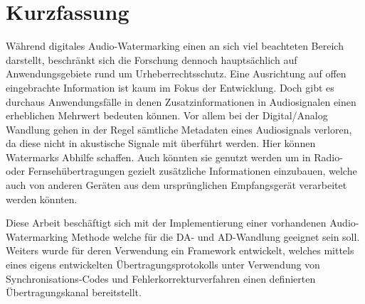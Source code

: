 \chapter*{Kurzfassung}

Während digitales Audio-Watermarking einen an sich viel beachteten Bereich darstellt, beschränkt sich die Forschung dennoch hauptsächlich auf Anwendungsgebiete rund um Urheberrechtsschutz. Eine Ausrichtung auf offen eingebrachte Information ist kaum im Fokus der Entwicklung. Doch gibt es durchaus Anwendungsfälle in denen Zusatzinformationen in Audiosignalen einen erheblichen Mehrwert bedeuten können. Vor allem bei der Digital/Analog Wandlung gehen in der Regel sämtliche Metadaten eines Audiosignals verloren, da diese nicht in akustische Signale mit überführt werden.
Hier können Watermarks Abhilfe schaffen. Auch könnten sie genutzt werden um in Radio- oder Fernsehübertragungen gezielt zusätzliche Informationen einzubauen, welche auch von anderen Geräten aus dem ursprünglichen Empfangsgerät verarbeitet werden könnten.

Diese Arbeit beschäftigt sich mit der Implementierung einer vorhandenen Audio-Water\-marking Methode welche für die DA- und AD-Wandlung geeignet sein soll. Weiters wurde für deren Verwendung ein Framework entwickelt, welches mittels eines eigens entwickelten Übertragungsprotokolls unter Verwendung von Synchronisations-Codes und Fehlerkorrekturverfahren einen definierten Übertragungskanal bereitstellt. 